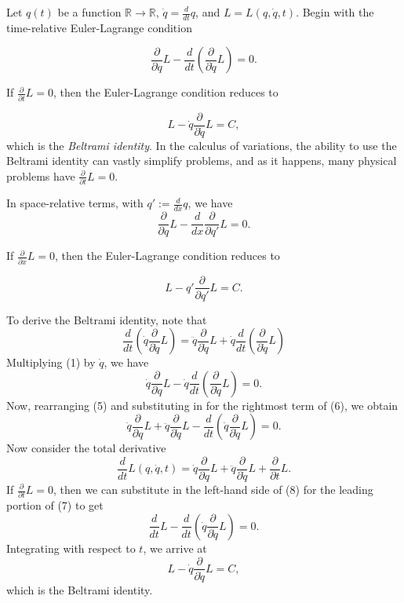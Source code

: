 \documentclass[12pt]{article}
\newcommand{\md}{d}
\newcommand{\mderiv}[1]{\frac{\md}{\md {#1}}} %
\newcommand{\mpderiv}[1]{\frac{\partial}{\partial {#1}}} %
\newcommand{\reals}{\mathbb{R}}
\newcommand{\defined}{:=}
\begin{document}
Let $q(t)$ be a function $\reals \to \reals$, $\dot{q} = \mderiv{t}{q}$, and $L = L(q, \dot{q}, t)$.  Begin with the time-relative Euler-Lagrange condition

\begin{equation}\label{el}
\mpderiv{q} L - \mderiv{t}\left(\mpderiv{\dot{q}} L\right) = 0.
\end{equation}

If $\mpderiv{t}L = 0$, then the Euler-Lagrange condition reduces to

\begin{equation}
L - \dot{q}{\mpderiv{\dot{q}} L} = C,
\end{equation}
which is the \emph{Beltrami identity}.  In the calculus of variations, the ability to use the Beltrami identity can vastly simplify problems, and as it happens, many physical problems have $\mpderiv{t}L = 0$.

In space-relative terms, with $q' \defined \mderiv{x}q$, we have 
\begin{equation}
\mpderiv{q} L - \mderiv{x}{\mpderiv{q'} L} = 0.
\end{equation}

If $\mpderiv{x}L = 0$, then the Euler-Lagrange condition reduces to

\begin{equation}
L - q' {\mpderiv{q'} L} = C.
\end{equation}

To derive the Beltrami identity, note that
\begin{equation}\label{step2}
\mderiv{t}\left(\dot{q}\mpderiv{\dot{q}}L\right) = \ddot{q}\mpderiv{\dot{q}}L + \dot{q}\mderiv{t}\left(\mpderiv{\dot{q}}L\right) 
\end{equation}
Multiplying (1) by $\dot{q}$, we have
\begin{equation}\label{step3}
\dot{q}\mpderiv{q} L - \dot{q}\mderiv{t}\left(\mpderiv{\dot{q}} L\right) = 0.
\end{equation}
Now, rearranging (5) and substituting in for the rightmost term of (6), we obtain
\begin{equation}\label{step4}
\dot{q}\mpderiv{q} L + \ddot{q}\mpderiv{\dot{q}}L - \mderiv{t}\left(\dot{q}\mpderiv{\dot{q}}L\right) = 0.
\end{equation}
Now consider the total derivative
\begin{equation}\label{step1}
\mderiv{t}L(q, \dot{q}, t) = \dot{q}\mpderiv{q}L + \ddot{q}\mpderiv{\dot{q}}L + \mpderiv{t}L.
\end{equation}
If $\mpderiv{t}L = 0$, then we can substitute in the left-hand side of (8) for the leading portion of (7) to get
\begin{equation}
\mderiv{t}L - \mderiv{t}\left(\dot{q}\mpderiv{\dot{q}}L\right) = 0.
\end{equation}
Integrating with respect to $t$, we arrive at
\begin{equation}
L - \dot{q}{\mpderiv{\dot{q}} L} = C,
\end{equation}
which is the Beltrami identity.
\end{document}
